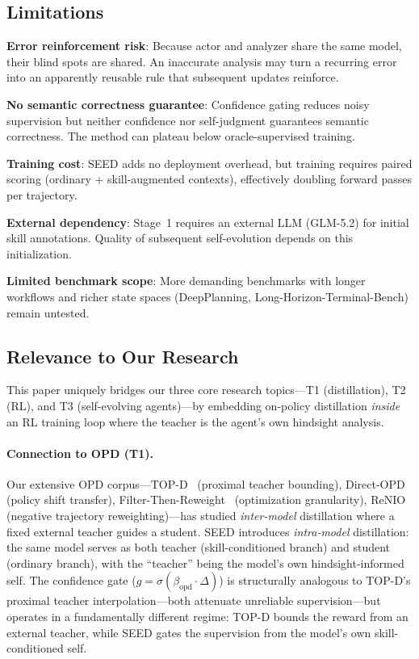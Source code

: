 \documentclass[11pt,a4paper]{article}
\begin{document}
\subsection{Limitations}

\textbf{Error reinforcement risk}: Because actor and analyzer share the same model, their blind spots are shared. An inaccurate analysis may turn a recurring error into an apparently reusable rule that subsequent updates reinforce.

\textbf{No semantic correctness guarantee}: Confidence gating reduces noisy supervision but neither confidence nor self-judgment guarantees semantic correctness. The method can plateau below oracle-supervised training.

\textbf{Training cost}: SEED adds no deployment overhead, but training requires paired scoring (ordinary + skill-augmented contexts), effectively doubling forward passes per trajectory.

\textbf{External dependency}: Stage~1 requires an external LLM (GLM-5.2) for initial skill annotations. Quality of subsequent self-evolution depends on this initialization.

\textbf{Limited benchmark scope}: More demanding benchmarks with longer workflows and richer state spaces (DeepPlanning, Long-Horizon-Terminal-Bench) remain untested.

\subsection{Relevance to Our Research}

This paper uniquely bridges our three core research topics---T1 (distillation), T2 (RL), and T3 (self-evolving agents)---by embedding on-policy distillation \emph{inside} an RL training loop where the teacher is the agent's own hindsight analysis.

\paragraph{Connection to OPD (T1).} Our extensive OPD corpus---TOP-D~\cite{topd2026} (proximal teacher bounding), Direct-OPD~\cite{directopd2026} (policy shift transfer), Filter-Then-Reweight~\cite{filter2026} (optimization granularity), ReNIO~\cite{renio2026} (negative trajectory reweighting)---has studied \emph{inter-model} distillation where a fixed external teacher guides a student. SEED introduces \emph{intra-model} distillation: the same model serves as both teacher (skill-conditioned branch) and student (ordinary branch), with the ``teacher'' being the model's own hindsight-informed self. The confidence gate ($g = \sigma(\beta_{\mathrm{opd}} \cdot \Delta)$) is structurally analogous to TOP-D's proximal teacher interpolation---both attenuate unreliable supervision---but operates in a fundamentally different regime: TOP-D bounds the reward from an external teacher, while SEED gates the supervision from the model's own skill-conditioned self.
\end{document}
